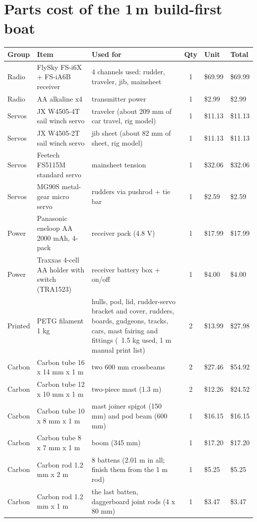 \documentclass[11pt]{article}
\begin{document}
\section{Parts cost of the 1\,m build-first boat}
{\small
\begin{longtable}{p{1.5cm}p{4.3cm}p{5.0cm}cp{1.2cm}p{1.2cm}}
\toprule
\textbf{Group} & \textbf{Item} & \textbf{Used for} & \textbf{Qty} & \textbf{Unit} & \textbf{Total} \\
\midrule\endhead
Radio & FlySky FS-i6X + FS-iA6B receiver & 4 channels used: rudder, traveler, jib, mainsheet & 1 & \$69.99 & \$69.99 \\
Radio & AA alkaline x4 & transmitter power & 1 & \$2.99 & \$2.99 \\
Servos & JX W4505-4T sail winch servo & traveler (about 209 mm of car travel, rig model) & 1 & \$11.13 & \$11.13 \\
Servos & JX W4505-2T sail winch servo & jib sheet (about 82 mm of sheet, rig model) & 1 & \$11.13 & \$11.13 \\
Servos & Feetech FS5115M standard servo & mainsheet tension & 1 & \$32.06 & \$32.06 \\
Servos & MG90S metal-gear micro servo & rudders via pushrod + tie bar & 1 & \$2.59 & \$2.59 \\
Power & Panasonic eneloop AA 2000 mAh, 4-pack & receiver pack (4.8 V) & 1 & \$17.99 & \$17.99 \\
Power & Traxxas 4-cell AA holder with switch (TRA1523) & receiver battery box + on/off & 1 & \$4.00 & \$4.00 \\
Printed & PETG filament 1 kg & hulls, pod, lid, rudder-servo bracket and cover, rudders, boards, gudgeons, tracks, cars, mast fairing and fittings (~1.5 kg used, 1 m manual print list) & 2 & \$13.99 & \$27.98 \\
Carbon & Carbon tube 16 x 14 mm x 1 m & two 600 mm crossbeams & 2 & \$27.46 & \$54.92 \\
Carbon & Carbon tube 12 x 10 mm x 1 m & two-piece mast (1.3 m) & 2 & \$12.26 & \$24.52 \\
Carbon & Carbon tube 10 x 8 mm x 1 m & mast joiner spigot (150 mm) and pod beam (600 mm) & 1 & \$16.15 & \$16.15 \\
Carbon & Carbon tube 8 x 7 mm x 1 m & boom (345 mm) & 1 & \$17.20 & \$17.20 \\
Carbon & Carbon rod 1.2 mm x 2 m & 8 battens (2.01 m in all; finish them from the 1 m rod) & 1 & \$5.25 & \$5.25 \\
Carbon & Carbon rod 1.2 mm x 1 m & the last batten, daggerboard joint rods (4 x 80 mm) & 1 & \$3.47 & \$3.47 \\

\end{longtable}}
\end{document}
